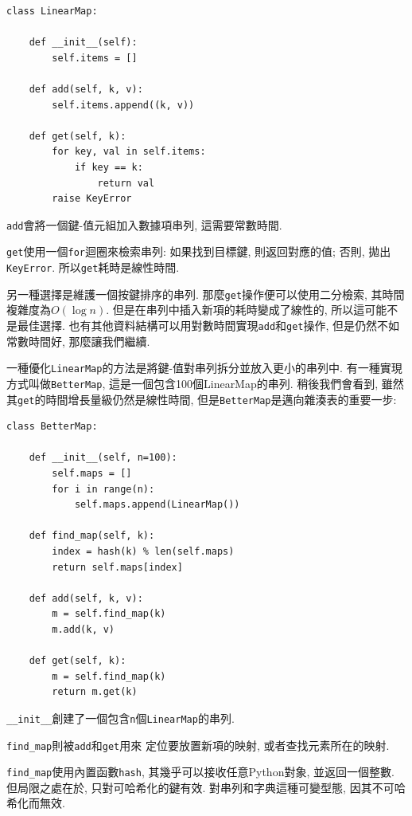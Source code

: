 \documentclass[10pt]{book}
\begin{document}
\begin{verbatim}
class LinearMap:

    def __init__(self):
        self.items = []

    def add(self, k, v):
        self.items.append((k, v))

    def get(self, k):
        for key, val in self.items:
            if key == k:
                return val
        raise KeyError
\end{verbatim}

{\tt add}會將一個鍵-值元組加入數據項串列, 這需要常數時間.

{\tt get}使用一個{\tt for}迴圈來檢索串列:
如果找到目標鍵, 則返回對應的值;
否則, 拋出{\tt KeyError}.
所以{\tt get}耗時是線性時間.

另一種選擇是維護一個按鍵排序的串列.
那麼{\tt get}操作便可以使用二分檢索, 其時間複雜度為$O(\log n)$.
但是在串列中插入新項的耗時變成了線性的,
所以這可能不是最佳選擇.
也有其他資料結構可以用對數時間實現{\tt add}和{\tt get}操作,
但是仍然不如常數時間好, 那麼讓我們繼續.

一種優化{\tt LinearMap}的方法是將鍵-值對串列拆分並放入更小的串列中. 
有一種實現方式叫做{\tt BetterMap}, 這是一個包含100個LinearMap的串列.
稍後我們會看到, 雖然其{\tt get}的時間增長量級仍然是線性時間,
但是{\tt BetterMap}是邁向雜湊表的重要一步:

\begin{verbatim}
class BetterMap:

    def __init__(self, n=100):
        self.maps = []
        for i in range(n):
            self.maps.append(LinearMap())

    def find_map(self, k):
        index = hash(k) % len(self.maps)
        return self.maps[index]

    def add(self, k, v):
        m = self.find_map(k)
        m.add(k, v)

    def get(self, k):
        m = self.find_map(k)
        return m.get(k)
\end{verbatim}

\verb"__init__"創建了一個包含{\tt n}個{\tt LinearMap}的串列.

\verb"find_map"則被{\tt add}和{\tt get}用來
定位要放置新項的映射, 或者查找元素所在的映射.

\verb"find_map"使用內置函數{\tt hash}, 其幾乎可以接收任意Python對象, 
並返回一個整數.
但局限之處在於, 只對可哈希化的鍵有效. 對串列和字典這種可變型態, 因其不可哈希化而無效.
\end{document}

